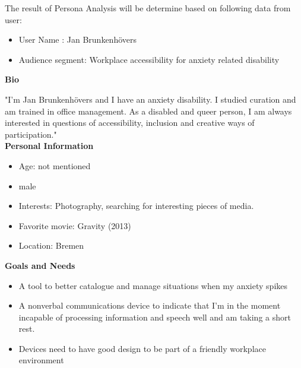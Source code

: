 The result of Persona Analysis will be determine based on following data from user:

\begin{itemize}
    \item User Name : Jan Brunkenhövers
    \item Audience segment: Workplace accessibility for anxiety related disability
\end{itemize}
\textbf{Bio}

    "I’m Jan Brunkenhövers and I have an anxiety disability. I studied curation and am trained in office management. As a disabled and queer person, I am always interested in questions of accessibility, inclusion and creative ways of participation."\\
    
\textbf{Personal Information}
\begin{itemize}
\item Age: not mentioned
\item male
\item Interests: Photography, searching for interesting pieces of media.
\item Favorite movie: Gravity (2013)
\item Location: Bremen 
\end{itemize}
\textbf{Goals and Needs}
\begin{itemize}
    \item A tool to better catalogue and manage situations when my anxiety spikes
    \item A nonverbal communications device to indicate that I’m in the moment incapable of processing information and speech well and am taking a short rest.
    \item Devices need to have good design to be part of a friendly workplace environment   
\end{itemize}
